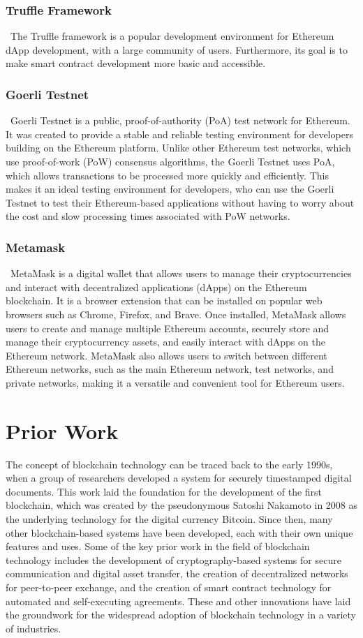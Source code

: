 \documentclass[10pt,twocolumn]{article}
\begin{document}
\subsubsection{Truffle Framework}\
The Truffle framework is a popular development environment for Ethereum dApp development, with a large community of users. Furthermore, its goal is to make smart contract development more basic and accessible.

\subsubsection{Goerli Testnet}\
Goerli Testnet is a public, proof-of-authority (PoA) test network for Ethereum. It was created to provide a stable and reliable testing environment for developers building on the Ethereum platform. Unlike other Ethereum test networks, which use proof-of-work (PoW) consensus algorithms, the Goerli Testnet uses PoA, which allows transactions to be processed more quickly and efficiently. This makes it an ideal testing environment for developers, who can use the Goerli Testnet to test their Ethereum-based applications without having to worry about the cost and slow processing times associated with PoW networks.

\subsubsection{Metamask}\
MetaMask is a digital wallet that allows users to manage their cryptocurrencies and interact with decentralized applications (dApps) on the Ethereum blockchain. It is a browser extension that can be installed on popular web browsers such as Chrome, Firefox, and Brave. Once installed, MetaMask allows users to create and manage multiple Ethereum accounts, securely store and manage their cryptocurrency assets, and easily interact with dApps on the Ethereum network. MetaMask also allows users to switch between different Ethereum networks, such as the main Ethereum network, test networks, and private networks, making it a versatile and convenient tool for Ethereum users.

\section{Prior Work}
The concept of blockchain technology can be traced back to the early 1990s, when a group of researchers developed a system for securely timestamped digital documents.\cite{Bartos} This work laid the foundation for the development of the first blockchain, which was created by the pseudonymous Satoshi Nakamoto in 2008 as the underlying technology for the digital currency Bitcoin. Since then, many other blockchain-based systems have been developed, each with their own unique features and uses. Some of the key prior work in the field of blockchain technology includes the development of cryptography-based systems for secure communication and digital asset transfer, the creation of decentralized networks for peer-to-peer exchange, and the creation of smart contract technology for automated and self-executing agreements. These and other innovations have laid the groundwork for the widespread adoption of blockchain technology in a variety of industries.
\end{document}
